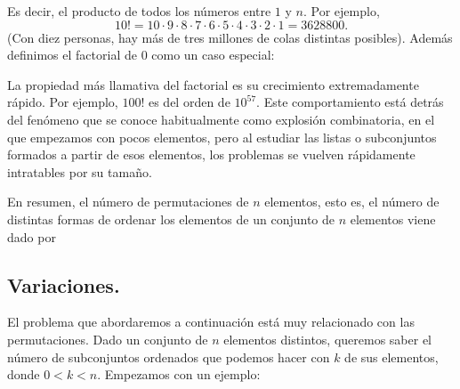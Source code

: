     \begin{center}
    \end{center}
Es decir, el producto de todos los números entre $1$ y $n$. Por ejemplo,
\[10!=10\cdot 9\cdot 8\cdot 7\cdot 6\cdot 5\cdot 4\cdot 3\cdot 2\cdot 1=3628800.\]
(Con diez personas, hay más de tres millones de colas distintas posibles). Además definimos el factorial de $0$ como un caso especial:
    \begin{center}
    \end{center}
La propiedad más llamativa del factorial es su crecimiento extremadamente rápido. Por ejemplo, $100!$ es del orden de $10^{57}$. Este comportamiento
está detrás del fenómeno que se conoce habitualmente como {\sf explosión combinatoria}, en el que empezamos con pocos
elementos, pero al estudiar las listas o subconjuntos formados a partir de esos elementos, los problemas se vuelven rápidamente intratables por su tamaño.

En resumen, el número de permutaciones de $n$ elementos, esto es, el n\'umero de {\sf distintas formas de ordenar} los elementos de un conjunto de $n$ elementos viene dado por
    \begin{center}
    \end{center}


\subsection{Variaciones.}
\label{cap03:subsec:variaciones}

El problema que abordaremos a continuación est\'a muy relacionado con las permutaciones.
Dado un conjunto de $n$ elementos distintos, queremos saber el número de subconjuntos ordenados que podemos hacer con $k$ de sus elementos, donde $0<k<n$. Empezamos con un ejemplo:

